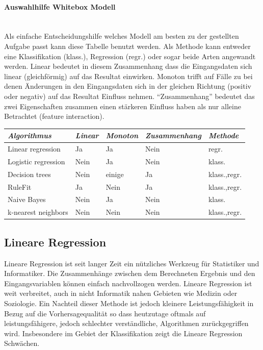 \documentclass[
  12pt, %
  a4paper, %
  oneside, %
  openany, 
  numbers=noenddot, %
  BCOR=5mm, %
  parskip=half*, %
  thesis, %
]{bfhbook}
\newcommand{\parag}[1]{\paragraph*{#1}\mbox{}\\}
\begin{document}
\parag{Auswahlhilfe Whitebox Modell}
Als einfache Entscheidungshilfe welches Modell am besten zu der gestellten Aufgabe passt kann diese Tabelle benutzt werden. Als Methode kann entweder eine Klassifikation (klass.), Regression (regr.) oder sogar beide Arten angewandt werden. Linear bedeutet in diesem Zusammenhang dass die Eingangsdaten sich linear (gleichförmig) auf das Resultat einwirken. Monoton trifft auf Fälle zu bei denen Änderungen in den Eingangsdaten sich in der gleichen Richtung (positiv oder negativ) auf das Resultat Einfluss nehmen. ``Zusammenhang'' bedeutet das zwei Eigenschaften zusammen einen stärkeren Einfluss haben als nur alleine Betrachtet (feature interaction).
\begin{table}[ht]
\begin{tabular}{@{} *5l @{}}    \toprule
	\emph{Algorithmus} & \emph{Linear} & \emph{Monoton} & \emph{Zusammenhang} & \emph{Methode}  \\\midrule
	Linear regression & Ja & Ja & 	Nein & regr. \\
	Logistic regression & Nein & Ja & 	Nein & klass. \\
	Decision trees & Nein & einige &	Ja & klass.,regr. \\
	RuleFit & Ja & Nein & Ja & 	klass.,regr. \\
	Naive Bayes	 & Nein & Ja & 	Nein & klass. \\
	k-nearest neighbors & Nein & Nein & Nein & klass.,regr. \\ \bottomrule
	 \hline
\end{tabular}
\end{table}

\subsection{Lineare Regression}
\label{lr}
Lineare Regression ist seit langer Zeit ein nützliches Werkzeug für Statistiker und Informatiker. Die Zusammenhänge zwischen dem Berechneten Ergebnis und den Eingangsvariablen können einfach nachvollzogen werden. Lineare Regression ist weit verbreitet, auch in nicht Informatik nahen Gebieten wie Medizin oder Soziologie. Ein Nachteil dieser Methode ist jedoch kleinere Leistungsfähigkeit in Bezug auf die Vorhersagequalität so dass heutzutage oftmals auf leistungsfähigere, jedoch schlechter verständliche, Algorithmen zurückgegriffen wird. Insbesondere im Gebiet der Klassifikation zeigt die Lineare Regression Schwächen.
\end{document}
